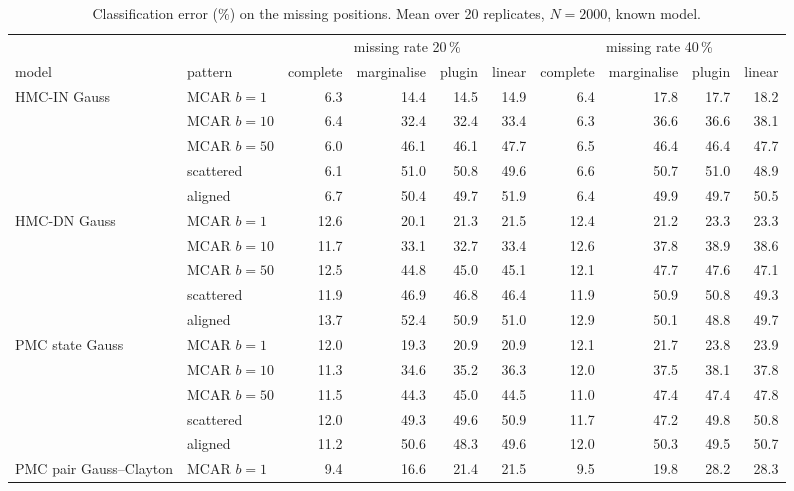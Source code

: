 \begin{table}[htbp]
  \centering
  \small
  \setlength{\tabcolsep}{4pt}
  \caption{Classification error (\%) on the missing positions. Mean over 20 replicates, $N = 2000$, known model.}
  \label{tab:missing-headline}
  \begin{tabular}{llrrrrrrrr}
    \toprule
     & & \multicolumn{4}{c}{missing rate 20\,\%} & \multicolumn{4}{c}{missing rate 40\,\%} \\
    \cmidrule(lr){3-6}\cmidrule(lr){7-10}
    model & pattern & complete & marginalise & plugin & linear & complete & marginalise & plugin & linear \\
    \midrule
    HMC-IN Gauss & MCAR $b{=}1$ & 6.3 & 14.4 & 14.5 & 14.9 & 6.4 & 17.8 & 17.7 & 18.2 \\
     & MCAR $b{=}10$ & 6.4 & 32.4 & 32.4 & 33.4 & 6.3 & 36.6 & 36.6 & 38.1 \\
     & MCAR $b{=}50$ & 6.0 & 46.1 & 46.1 & 47.7 & 6.5 & 46.4 & 46.4 & 47.7 \\
     & scattered & 6.1 & 51.0 & 50.8 & 49.6 & 6.6 & 50.7 & 51.0 & 48.9 \\
     & aligned & 6.7 & 50.4 & 49.7 & 51.9 & 6.4 & 49.9 & 49.7 & 50.5 \\
    \addlinespace
    HMC-DN Gauss & MCAR $b{=}1$ & 12.6 & 20.1 & 21.3 & 21.5 & 12.4 & 21.2 & 23.3 & 23.3 \\
     & MCAR $b{=}10$ & 11.7 & 33.1 & 32.7 & 33.4 & 12.6 & 37.8 & 38.9 & 38.6 \\
     & MCAR $b{=}50$ & 12.5 & 44.8 & 45.0 & 45.1 & 12.1 & 47.7 & 47.6 & 47.1 \\
     & scattered & 11.9 & 46.9 & 46.8 & 46.4 & 11.9 & 50.9 & 50.8 & 49.3 \\
     & aligned & 13.7 & 52.4 & 50.9 & 51.0 & 12.9 & 50.1 & 48.8 & 49.7 \\
    \addlinespace
    PMC state Gauss & MCAR $b{=}1$ & 12.0 & 19.3 & 20.9 & 20.9 & 12.1 & 21.7 & 23.8 & 23.9 \\
     & MCAR $b{=}10$ & 11.3 & 34.6 & 35.2 & 36.3 & 12.0 & 37.5 & 38.1 & 37.8 \\
     & MCAR $b{=}50$ & 11.5 & 44.3 & 45.0 & 44.5 & 11.0 & 47.4 & 47.4 & 47.8 \\
     & scattered & 12.0 & 49.3 & 49.6 & 50.9 & 11.7 & 47.2 & 49.8 & 50.8 \\
     & aligned & 11.2 & 50.6 & 48.3 & 49.6 & 12.0 & 50.3 & 49.5 & 50.7 \\
    \addlinespace
    PMC pair Gauss--Clayton & MCAR $b{=}1$ & 9.4 & 16.6 & 21.4 & 21.5 & 9.5 & 19.8 & 28.2 & 28.3 \\

\end{tabular}
\end{table}
